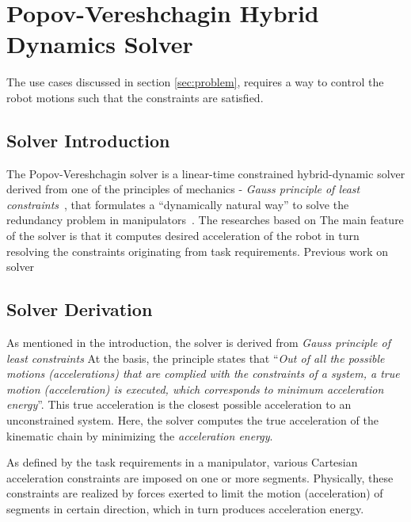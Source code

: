 \chapter{Popov-Vereshchagin Hybrid Dynamics Solver}
\label{chap:solver}
The use cases discussed in section \ref{sec:problem}, requires a way to control the robot motions such that the constraints are satisfied. 


\section{Solver Introduction}

The Popov-Vereshchagin solver is a linear-time constrained hybrid-dynamic solver derived from one of the principles of mechanics - \textit{Gauss principle of least constraints}~\cite{vereshchagin1989modeling}, that formulates a ``dynamically natural way'' to solve the redundancy problem in manipulators~\cite{bruyninckx2000gauss}. The researches based on The main feature of the solver is that it computes desired acceleration of the robot in turn resolving the constraints originating from task requirements. Previous work on solver \cite{article}


\section{Solver Derivation}
As mentioned in the introduction, the solver is derived from \textit{Gauss principle of least constraints} At the basis, the principle states that ``\textit{Out of all the possible motions (accelerations) that are complied with the constraints of a system, a true motion (acceleration) is executed, which corresponds to minimum acceleration energy}''. This true acceleration is the closest possible acceleration to an unconstrained system. Here, the solver computes the true acceleration of the kinematic chain by minimizing the \textit{acceleration energy}. 

 As defined by the task requirements in a manipulator, various Cartesian acceleration constraints are imposed on one or more segments. Physically, these constraints are realized by forces exerted to limit the motion (acceleration) of segments in certain direction, which in turn produces acceleration energy. 
 
